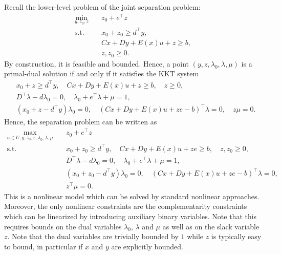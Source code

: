 
Recall the lower-level problem of the joint separation problem:
%
\begin{subequations}
    \begin{align}
        \min_{y,z_0,z} \quad & z_0 + e^\top z \\
        \text{s.t.} \quad & x_0 + z_0 \ge d^\top y, \\
        & Cx + Dy + E(x)u + z \ge b, \\
        & z, z_0 \ge 0.
    \end{align}
\end{subequations}
By construction, it is feasible and bounded. Hence, a point
$(y,z,\lambda_0,\lambda,\mu)$ is a primal-dual solution if and only if it
satisfies the KKT system 
\begin{align*}
    & x_0 + z \ge d^\top y, \quad Cx + Dy + E(x)u + z \ge b, \quad z \ge 0, \\
    & D^\top\lambda - d \lambda_0 = 0, \quad \lambda_0 + e^\top\lambda + \mu = 1, \\
    & (x_0 + z - d^\top y)\lambda_0 = 0, \quad 
    (Cx + Dy + E(x)u + ze - b)^\top \lambda = 0, \quad 
    z\mu = 0.
\end{align*}
Hence, the separation problem can be written as 
\begin{align*}
    \max_{u\in U, y,z_0,z,\lambda_0,\lambda,\mu} \quad & z_0 + e^\top z \\
    \text{s.t.} \quad & x_0 + z_0 \ge d^\top y, \quad Cx + Dy + E(x)u + ze \ge b, \quad z, z_0 \ge 0, \\
    & D^\top\lambda - d \lambda_0 = 0, \quad \lambda_0 + e^\top\lambda + \mu = 1, \\
    & (x_0 + z_0 - d^\top y)\lambda_0 = 0, \quad 
    (Cx + Dy + E(x)u + ze - b)^\top \lambda = 0, \\
    & z^\top\mu = 0.
\end{align*}
%
This is a nonlinear model which can be solved by standard nonlinear
approaches. Moreover, the only nonlinear constraints are the complementarity
constraints which can be linearized by introducing auxiliary binary variables.
Note that this requires bounds on the dual variables $\lambda_0$, $\lambda$
and $\mu$ as well as on the slack variable $z$. Note that the dual variables
are trivially bounded by $1$ while $z$ is typically easy to bound, in
particular if $x$ and $y$ are explicitly bounded. 


